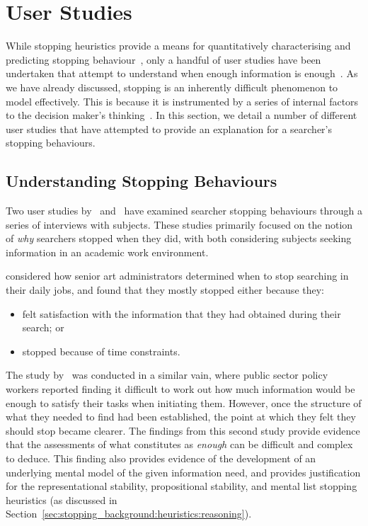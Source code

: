 \section{User Studies}\label{sec:stopping_background:user_studies}
While stopping heuristics provide a means for quantitatively characterising and predicting stopping behaviour~\citep{wu2014information_scent}, only a handful of user studies have been undertaken that attempt to understand when enough information is enough~\citep{zach2005enough_is_enough}. As we have already discussed, stopping is an inherently difficult phenomenon to model effectively. This is because it is instrumented by a series of internal factors to the decision maker's thinking~\citep{nickles1995judgment}. In this section, we detail a number of different user studies that have attempted to provide an explanation for a searcher's stopping behaviours.

\subsection{Understanding Stopping Behaviours}
Two user studies by~\cite{zach2005enough_is_enough} and~\cite{berryman2006defines} have examined searcher stopping behaviours through a series of interviews with subjects. These studies primarily focused on the notion of \emph{why} searchers stopped when they did, with both considering subjects seeking information in an academic work environment.

\cite{zach2005enough_is_enough} considered how senior art administrators determined when to stop searching in their daily jobs, and found that they mostly stopped either because they:

\begin{itemize}
    \item{felt satisfaction with the information that they had obtained during their search; or}
    \item{stopped because of time constraints.}
\end{itemize}

The study by~\cite{berryman2006defines} was conducted in a similar vain, where public sector policy workers reported finding it difficult to work out how much information would be enough to satisfy their tasks when initiating them. However, once the structure of what they needed to find had been established, the point at which they felt they should stop became clearer. The findings from this second study provide evidence that the assessments of what constitutes as \emph{enough} can be difficult and complex to deduce. This finding also provides evidence of the development of an underlying mental model of the given information need, and provides justification for the representational stability, propositional stability, and mental list stopping heuristics (as discussed in Section~\ref{sec:stopping_background:heuristics:reasoning}).

